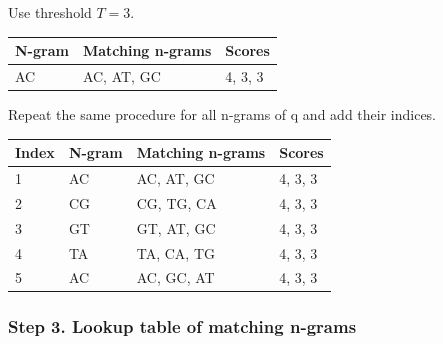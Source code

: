 \noindent
Use threshold $T =3$.
\begin{table}[H]
\small
\begin{tabular}{|l|l|l|}
\hline
\textbf{N-gram} & \textbf{Matching n-grams} & \textbf{Scores} \\ \hline
AC              & AC, AT, GC                & 4, 3, 3         \\ \hline
\end{tabular}
\end{table}

\noindent
Repeat the same procedure for all n-grams of q and add their indices.
\begin{table}[H]
\small
\begin{tabular}{|l|l|l|l|}
\hline
\textbf{Index} & \textbf{N-gram} & \textbf{Matching n-grams} & \textbf{Scores} \\ \hline
1              & AC              & AC, AT, GC                & 4, 3, 3         \\ \hline
2              & CG              & CG, TG, CA                & 4, 3, 3         \\ \hline
3              & GT              & GT, AT, GC                & 4, 3, 3         \\ \hline
4              & TA              & TA, CA, TG                & 4, 3, 3         \\ \hline
5              & AC              & AC, GC, AT                & 4, 3, 3         \\ \hline
\end{tabular}
\end{table}

%
%
\subsubsection*{Step 3. Lookup table of matching n-grams} 

